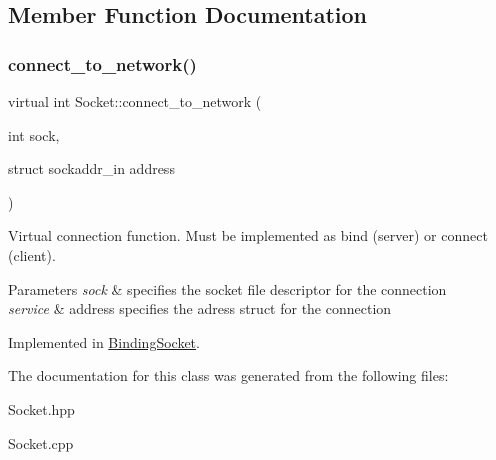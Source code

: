\subsection{Member Function Documentation}
\mbox{\label{classSocket_a2483ca0900b0d55cfeb4b6cf5724c1e7}} 
\subsubsection{\texorpdfstring{connect\+\_\+to\+\_\+network()}{connect\_to\_network()}}
{\footnotesize\ttfamily virtual int Socket\+::connect\+\_\+to\+\_\+network (\begin{DoxyParamCaption}\item[{int}]{sock,  }\item[{struct sockaddr\+\_\+in}]{address }\end{DoxyParamCaption})\hspace{0.3cm}{\ttfamily [pure virtual]}}



Virtual connection function. Must be implemented as bind (server) or connect (client). 


\begin{DoxyParams}{Parameters}
{\em sock} & specifies the socket file descriptor for the connection \\
\hline
{\em service} & address specifies the adress struct for the connection \\
\hline
\end{DoxyParams}


Implemented in \hyperlink{classBindingSocket_a02a8a46a6a5d5c3205d53f2a9840455a}{Binding\+Socket}.



The documentation for this class was generated from the following files\+:\begin{DoxyCompactItemize}
\item 
Socket.\+hpp\item 
Socket.\+cpp\end{DoxyCompactItemize}
